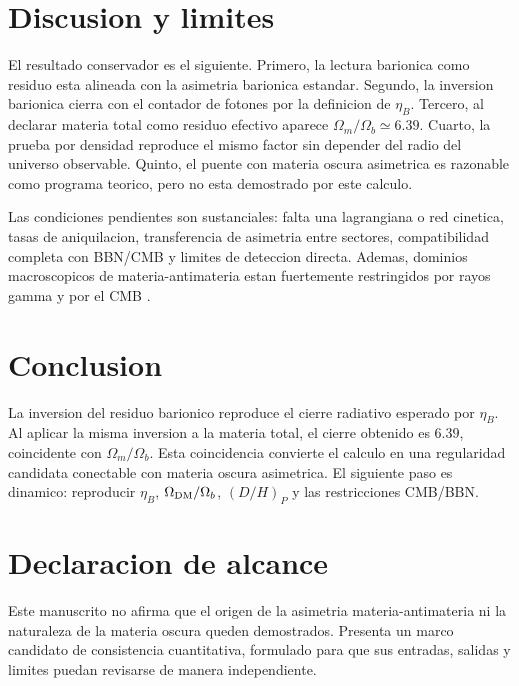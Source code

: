 \documentclass[10pt,twocolumn]{article}
\begin{document}
\section{Discusion y limites}

El resultado conservador es el siguiente. Primero, la lectura barionica como residuo esta alineada con la asimetria barionica estandar. Segundo, la inversion barionica cierra con el contador de fotones por la definicion de $\eta_B$. Tercero, al declarar materia total como residuo efectivo aparece $\Omega_m/\Omega_b\simeq6.39$. Cuarto, la prueba por densidad reproduce el mismo factor sin depender del radio del universo observable. Quinto, el puente con materia oscura asimetrica es razonable como programa teorico, pero no esta demostrado por este calculo.

Las condiciones pendientes son sustanciales: falta una lagrangiana o red cinetica, tasas de aniquilacion, transferencia de asimetria entre sectores, compatibilidad completa con BBN/CMB y limites de deteccion directa. Ademas, dominios macroscopicos de materia-antimateria estan fuertemente restringidos por rayos gamma y por el CMB \cite{cohen_derujula_glashow_1998}.

\section{Conclusion}

La inversion del residuo barionico reproduce el cierre radiativo esperado por $\eta_B$. Al aplicar la misma inversion a la materia total, el cierre obtenido es $6.39$, coincidente con $\Omega_m/\Omega_b$. Esta coincidencia convierte el calculo en una regularidad candidata conectable con materia oscura asimetrica. El siguiente paso es dinamico: reproducir $\eta_B$, $\Omega_{\rm DM}/\Omega_b$, $(D/H)_P$ y las restricciones CMB/BBN.

\section*{Declaracion de alcance}

Este manuscrito no afirma que el origen de la asimetria materia-antimateria ni la naturaleza de la materia oscura queden demostrados. Presenta un marco candidato de consistencia cuantitativa, formulado para que sus entradas, salidas y limites puedan revisarse de manera independiente.
\end{document}
